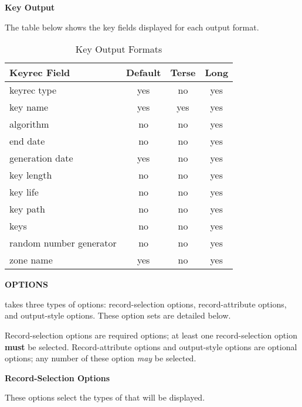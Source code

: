 \eject

{\bf Key  Output}

The table below shows the key  fields displayed for each
output format.

\begin{table}[ht]
\begin{center}
\begin{tabular}{|l|c|c|c|}
\hline
{\bf Keyrec Field} & {\bf Default} & {\bf Terse} & {\bf Long} \\
\hline
keyrec type             &  yes & no  & yes \\
key name                &  yes & yes & yes \\
algorithm               &  no  & no  & yes \\
end date                &  no  & no  & yes \\
generation date         &  yes & no  & yes \\
key length              &  no  & no  & yes \\
key life                &  no  & no  & yes \\
key path                &  no  & no  & yes \\
keys                    &  no  & no  & yes \\
random number generator &  no  & no  & yes \\
zone name               &  yes & no  & yes \\
\hline
\end{tabular}
\end{center}
\caption{ Key Output Formats}
\end{table}

{\bf OPTIONS}

 takes three types of options:  record-selection options,
record-attribute options, and output-style options.  These option
sets are detailed below.

Record-selection options are required options; at least one record-selection
option {\bf must} be selected.  Record-attribute options and output-style
options are optional options; any number of these option {\it may} be
selected.

{\bf Record-Selection Options}

These options select the types of  that will be displayed.

